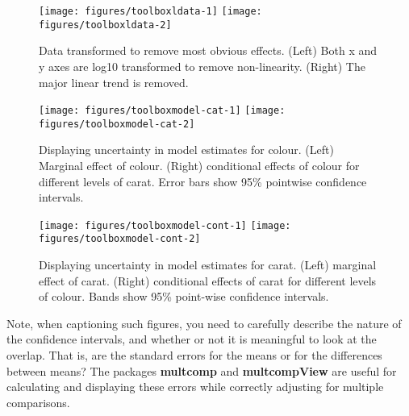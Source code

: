 \begin{figure}

{\centering \texttt{[image: figures/toolboxldata-1]} \texttt{[image: figures/toolboxldata-2]} 

}

\caption{Data transformed to remove most obvious effects. (Left) Both x and y axes are log10 transformed to remove non-linearity. (Right) The major linear trend is removed.\label{fig:ldata}}
\end{figure}

\begin{figure}

{\centering \texttt{[image: figures/toolboxmodel-cat-1]} \texttt{[image: figures/toolboxmodel-cat-2]} 

}

\caption{Displaying uncertainty in model estimates for colour. (Left) Marginal effect of colour. (Right) conditional effects of colour for different levels of carat. Error bars show 95\% pointwise confidence intervals.\label{fig:model-cat}}
\end{figure}

\begin{figure}

{\centering \texttt{[image: figures/toolboxmodel-cont-1]} \texttt{[image: figures/toolboxmodel-cont-2]} 

}

\caption{Displaying uncertainty in model estimates for carat. (Left) marginal effect of carat. (Right) conditional effects of carat for different levels of colour. Bands show 95\% point-wise confidence intervals.\label{fig:model-cont}}
\end{figure}

Note, when captioning such figures, you need to carefully describe the
nature of the confidence intervals, and whether or not it is meaningful
to look at the overlap. That is, are the standard errors for the means
or for the differences between means? The packages \textbf{multcomp} and
\textbf{multcompView} are useful for calculating and displaying these
errors while correctly adjusting for multiple comparisons.
 


